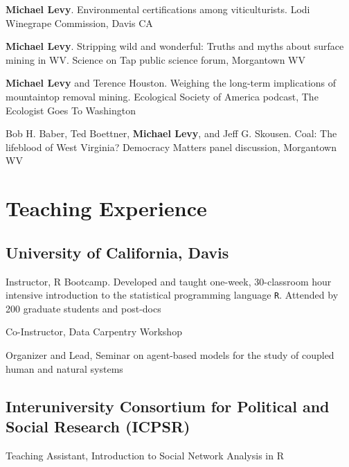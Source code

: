 \begin{description}
\tightlist
\item[2014]
\textbf{Michael Levy}. Environmental certifications among
viticulturists. Lodi Winegrape Commission, Davis CA
\item[2012]
\textbf{Michael Levy}. Stripping wild and wonderful: Truths and myths
about surface mining in WV. Science on Tap public science forum,
Morgantown WV
\item[2011]
\textbf{Michael Levy} and Terence Houston. Weighing the long-term
implications of mountaintop removal mining. Ecological Society of
America podcast, The Ecologist Goes To Washington
\item[2011]
Bob H. Baber, Ted Boettner, \textbf{Michael Levy}, and Jeff G. Skousen.
Coal: The lifeblood of West Virginia? Democracy Matters panel
discussion, Morgantown WV
\end{description}

\section{Teaching Experience}\label{teaching-experience}

\subsection{University of California,
Davis}\label{university-of-california-davis}

\begin{description}
\tightlist
\item[2015]
Instructor, R Bootcamp. Developed and taught one-week, 30-classroom hour
intensive introduction to the statistical programming language
\texttt{R}. Attended by 200 graduate students and post-docs
\item[2015]
Co-Instructor, Data Carpentry Workshop
\item[2013]
Organizer and Lead, Seminar on agent-based models for the study of
coupled human and natural systems
\end{description}

\subsection{Interuniversity Consortium for Political and Social Research
(ICPSR)}\label{interuniversity-consortium-for-political-and-social-research-icpsr}

\begin{description}
\tightlist
\item[2015]
Teaching Assistant, Introduction to Social Network Analysis in R
\end{description}


